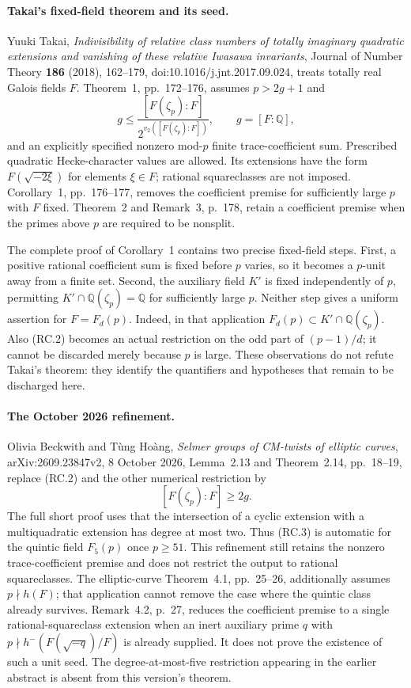 \paragraph{Takai's fixed-field theorem and its seed.}
Yuuki Takai, \emph{Indivisibility of relative class numbers of totally
imaginary quadratic extensions and vanishing of these relative Iwasawa
invariants}, Journal of Number Theory \textbf{186} (2018), 162--179,
doi:10.1016/j.jnt.2017.09.024, treats totally real Galois fields $F$.
Theorem~1, pp.~172--176, assumes $p>2g+1$ and
\[
 g\leq \frac{[F(\zeta_p):F]}
                 {2^{v_2([F(\zeta_p):F])}},\qquad g=[F:\mathbb Q],
                                                               \tag{RC.2}
\]
and an explicitly specified nonzero mod-$p$ finite trace-coefficient
sum.  Prescribed quadratic Hecke-character values are allowed.  Its
extensions have the form $F(\sqrt{-2\xi})$ for elements $\xi\in F$;
rational squareclasses are not imposed.  Corollary~1, pp.~176--177,
removes the coefficient premise for sufficiently large $p$ with $F$
fixed.  Theorem~2 and Remark~3, p.~178, retain a coefficient premise
when the primes above $p$ are required to be nonsplit.

The complete proof of Corollary~1 contains two precise fixed-field
steps.  First, a positive rational coefficient sum is fixed before
$p$ varies, so it becomes a $p$-unit away from a finite set.  Second,
the auxiliary field $K'$ is fixed independently of $p$, permitting
$K'\cap\mathbb Q(\zeta_p)=\mathbb Q$ for sufficiently large $p$.
Neither step gives a uniform assertion for $F=F_d(p)$.  Indeed, in
that application $F_d(p)\subset K'\cap\mathbb Q(\zeta_p)$.
Also (RC.2) becomes an actual restriction on the odd part of
$(p-1)/d$; it cannot be discarded merely because $p$ is large.
These observations do not refute Takai's theorem: they identify the
quantifiers and hypotheses that remain to be discharged here.

\paragraph{The October 2026 refinement.}
Olivia Beckwith and T\`ung Ho\`ang, \emph{Selmer groups of CM-twists
of elliptic curves}, arXiv:2609.23847v2, 8 October 2026,
Lemma~2.13 and Theorem~2.14, pp.~18--19, replace (RC.2) and the
other numerical restriction by
\[
                         [F(\zeta_p):F]\geq 2g.        \tag{RC.3}
\]
The full short proof uses that the intersection of a cyclic extension
with a multiquadratic extension has degree at most two.  Thus (RC.3)
is automatic for the quintic field $F_5(p)$ once $p\geq51$.
This refinement still retains the nonzero trace-coefficient premise
and does not restrict the output to rational squareclasses.
The elliptic-curve Theorem~4.1, pp.~25--26, additionally assumes
$p\nmid h(F)$; that application cannot remove the case where the
quintic class already survives.  Remark~4.2, p.~27, reduces the
coefficient premise to a single rational-squareclass extension when
an inert auxiliary prime $q$ with $p\nmid h^-(F(\sqrt{-q})/F)$
is already supplied.  It does not prove the existence of such a
unit seed.  The degree-at-most-five restriction appearing in the
earlier abstract is absent from this version's theorem.

